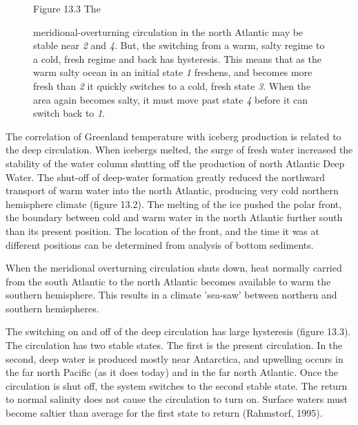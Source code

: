 \begin{enumerate}
\begin{figure}[b!]
\vspace{-2ex}
\footnotesize
Figure 13.3 The \rule{0mm}{3ex}meridional-overturning circulation in the north Atlantic may be stable near \textit{2} and \textit{4}. But, the switching from a warm, salty regime to a cold, fresh regime and back has hysteresis. This means that as the warm salty ocean in an initial state \textit{1} freshens, and becomes more fresh than \textit{2} it quickly switches
to a cold, fresh state
\textit{3}. When the area again becomes salty, it must move past state
\textit{4} before it can switch back to \textit{1}.
\label{fig:hysteresis}
\end{figure}

\vitem The correlation of Greenland temperature with iceberg production is related to the deep circulation. When icebergs melted, the surge of fresh water increased the stability of the water column shutting off the production of north Atlantic Deep Water. The shut-off of deep-water formation greatly reduced the northward transport of warm water into the north Atlantic, producing very cold northern hemisphere climate (figure 13.2). The melting of the ice pushed the polar front, the boundary between cold and warm water in the north Atlantic further south than its present position. The location of the front, and the time it was at different positions can be determined from analysis of bottom sediments. 

\vitem When the meridional overturning circulation shuts down, heat normally carried from the south Atlantic to the north Atlantic becomes available to warm the southern hemisphere. This results in a climate 'sea-saw' between northern and southern hemispheres.

\vitem The switching on and off of the deep circulation has large hysteresis (figure 13.3). The circulation has two stable states. The first is the present circulation. In the second, deep water is produced mostly near Antarctica, and upwelling occurs in the far north Pacific (as it does today) and in the far north Atlantic. Once the circulation is shut off, the system switches to the second stable state. The return to normal salinity does not cause the circulation to turn on. Surface waters must become saltier than average for the first state to return (Rahmstorf, 1995).


\end{enumerate}
